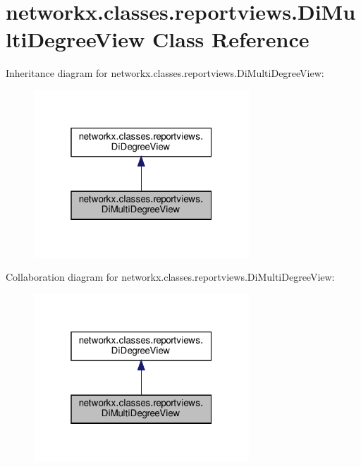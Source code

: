\hypertarget{classnetworkx_1_1classes_1_1reportviews_1_1DiMultiDegreeView}{}\section{networkx.\+classes.\+reportviews.\+Di\+Multi\+Degree\+View Class Reference}
\label{classnetworkx_1_1classes_1_1reportviews_1_1DiMultiDegreeView}


Inheritance diagram for networkx.\+classes.\+reportviews.\+Di\+Multi\+Degree\+View\+:
\nopagebreak
\begin{figure}[H]
\begin{center}
\leavevmode
\includegraphics[width=229pt]{classnetworkx_1_1classes_1_1reportviews_1_1DiMultiDegreeView__inherit__graph}
\end{center}
\end{figure}


Collaboration diagram for networkx.\+classes.\+reportviews.\+Di\+Multi\+Degree\+View\+:
\nopagebreak
\begin{figure}[H]
\begin{center}
\leavevmode
\includegraphics[width=229pt]{classnetworkx_1_1classes_1_1reportviews_1_1DiMultiDegreeView__coll__graph}
\end{center}
\end{figure}
